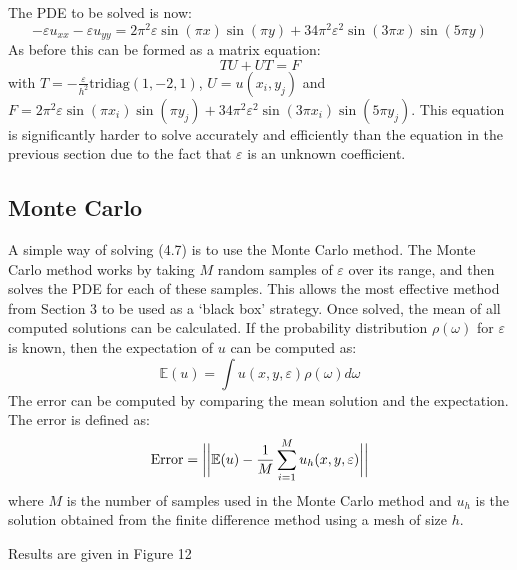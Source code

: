 \documentclass{article}
\numberwithin{equation}{section}
\begin{document}
The PDE to be solved is now:
\begin{equation}
- \varepsilon u_{xx} - \varepsilon u_{yy} = 2\pi^2 \varepsilon \sin(\pi x) \sin(\pi y)+ 34 \pi^2 \varepsilon^2 \sin(3 \pi x) \sin(5 \pi y)
\end{equation}
As before this can be formed as a matrix equation:
\begin{equation}
TU + UT = F
\end{equation}
with $T = -\frac{\varepsilon}{h^2} \text{tridiag}(1,-2,1)$, $U = u(x_i, y_j)$ and $F = 2\pi^2 \varepsilon \sin(\pi x_i) \sin(\pi y_j)+ 34 \pi^2 \varepsilon^2 \sin(3 \pi x_i) \sin(5 \pi y_j)$. This equation is significantly harder to solve accurately and efficiently than the equation in the previous section due to the fact that $\varepsilon$ is an unknown coefficient.

\subsection{Monte Carlo}
A simple way of solving (4.7) is to use the Monte Carlo method. The Monte Carlo method works by taking $M$ random samples of $\varepsilon$ over its range, and then solves the PDE for each of these samples. 
This allows the most effective method from Section 3 to be used as a `black box' strategy. Once solved, the mean of all computed solutions can be calculated. If the probability distribution $\rho(\omega)$ for $\varepsilon$ is known, then the expectation of $u$ can be computed as:
\begin{equation}
\mathbb{E}(u) = \int u(x,y,\varepsilon) \rho(\omega) d \omega
\end{equation}
The error can be computed by comparing the mean solution and the expectation. The error is defined as: 
\begin{equation}
\text{Error} = \bigg{|} \bigg{|} \mathbb{E}(u) - \frac{1}{M} \sum_{i=1}^M u_h (x, y, \varepsilon) \bigg{|}\bigg{|}
\end{equation}
where $M$ is the number of samples used in the Monte Carlo method and $u_h$ is the solution obtained from the finite difference method using a mesh of size $h$.

Results are given in Figure 12


\newpage



\end{document}
